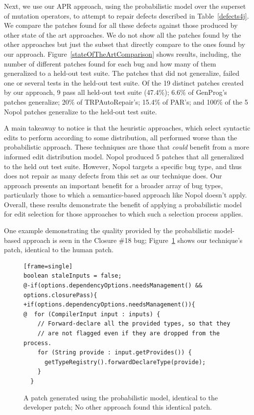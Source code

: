 \documentclass[conference]{IEEEtran}
\begin{document}
Next, we use our APR approach, using the probabilistic model over the superset
of mutation operators, to attempt to repair  
defects described in Table~\ref{defects4j}. We compare the patches
found for all these defects against those produced by other state of the art
approaches. We do not 
show all the patches found by the other approaches but just the subset that
directly compare to the ones found by our approach. 
Figure~\ref{stateOfTheArtComparison} shows
results, including, the number of different patches found for each bug and how many of them generalized
to a held-out test suite. The patches that did not generalize, failed one or 
several tests in the held-out test suite. Of the
19 distinct patches created by our approach, 
9 pass all held-out test suite (47.4\%); 
6.6\% of GenProg's patches generalize; 20\% of TRPAutoRepair's;
15.4\% of PAR's; and 100\% of the 5 Nopol patches generalize to the held-out test suite.

A main takeaway to notice is that the heuristic approaches, which select
syntactic edits to perform according to some distribution, all performed worse 
than the probabilistic approach.  These techniques are those that \emph{could}
benefit from a more informed edit distribution model.  
Nopol produced 5 patches that all generalized to the held out test suite.  However, Nopol
targets a specific bug type,  and thus does not repair as many defects from this
set as our technique does.  Our approach presents an important benefit for a
broader array of bug types, particularly those to which a semantics-based
approach like Nopol doesn't apply. Overall, these results demonstrate the
benefit of applying a probabilistic model for edit selection for those
approaches to which such a selection process applies. 

One example demonstrating the quality provided by the probabilistic
model-based approach is seen in the Closure \#18 bug; Figure~\ref{closure18prob} 
shows our technique's patch, identical to the human patch.

\begin{figure}[t]
\begin{lstlisting}[firstnumber=1284][frame=single]
boolean staleInputs = false;
@-if(options.dependencyOptions.needsManagement() && options.closurePass){
+if(options.dependencyOptions.needsManagement()){
@  for (CompilerInput input : inputs) {
    // Forward-declare all the provided types, so that they
    // are not flagged even if they are dropped from the process.
    for (String provide : input.getProvides()) {
      getTypeRegistry().forwardDeclareType(provide);
    }  
  }
	\end{lstlisting}

	\caption{A patch generated using the probabilistic model, identical to the
      developer patch; No other approach found this identical patch.\label{closure18prob}}
\end{figure}
\end{document}
